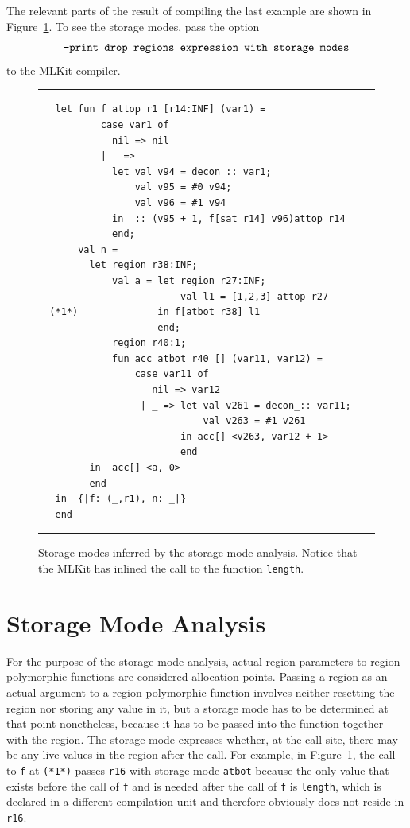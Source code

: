 \documentclass[12pt]{book}
\begin{document}
The relevant parts of the result of compiling the last example are
shown in Figure~\ref{sma1.fig}.  To see the storage modes, pass the option
%
$$\hbox{\tt -print\_drop\_regions\_expression\_with\_storage\_modes}$$
to the MLKit compiler.


\begin{figure}
\hrule
\medskip
\begin{verbatim}
   let fun f attop r1 [r14:INF] (var1) =
           case var1 of
             nil => nil
           | _ =>
             let val v94 = decon_:: var1;
                 val v95 = #0 v94;
                 val v96 = #1 v94
             in  :: (v95 + 1, f[sat r14] v96)attop r14
             end;
       val n =
         let region r38:INF;
             val a = let region r27:INF;
                         val l1 = [1,2,3] attop r27
  (*1*)              in f[atbot r38] l1
                     end;
             region r40:1;
             fun acc atbot r40 [] (var11, var12) =
                 case var11 of
                    nil => var12
                  | _ => let val v261 = decon_:: var11;
                             val v263 = #1 v261
                         in acc[] <v263, var12 + 1>
                         end
         in  acc[] <a, 0>
         end
   in  {|f: (_,r1), n: _|}
   end
\end{verbatim}
\caption{Storage modes inferred by the storage mode analysis. Notice
  that the MLKit has inlined the call to the function
  \texttt{length}.}
\label{sma1.fig}
\medskip
\hrule
\end{figure}

\section{Storage Mode Analysis}
\label{sma.sec}
For the purpose of the storage mode analysis, actual region parameters
to region-polymorphic functions are considered allocation points.
Passing a region as an actual argument to a region-polymorphic
function involves neither resetting the region nor storing any value
in it, but a storage mode has to be determined at that point
nonetheless, because it has to be passed into the function together
with the region. The storage mode expresses whether, at the call site,
there may be any live values in the region after the call. For
example, in Figure~\ref{sma1.fig}, the call to {\tt f} at {\tt (*1*)}
passes {\tt r16} with storage mode {\tt atbot} because the only value
that exists before the call of {\tt f} and is needed after the call of
{\tt f} is {\tt length}, which is declared in a different compilation
unit and therefore obviously does not reside in {\tt r16}.
\end{document}
